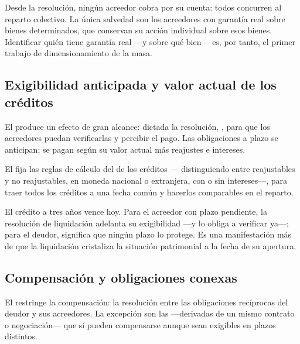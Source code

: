 \begin{foco}
Desde la resolución, ningún acreedor cobra por su cuenta: todos concurren al reparto colectivo.
La única salvedad son los acreedores con garantía real sobre bienes determinados, que conservan
su acción individual sobre esos bienes. Identificar quién tiene garantía real ---y sobre qué
bien--- es, por tanto, el primer trabajo de dimensionamiento de la masa.
\end{foco}

\subsection{Exigibilidad anticipada y valor actual de los créditos}

El  produce un efecto de gran alcance: dictada la resolución, , para que los
acreedores puedan verificarlas y percibir el pago. Las obligaciones a plazo se anticipan; se
pagan según su valor actual más reajustes e intereses.

El  fija las reglas de cálculo del  de los créditos ---
distinguiendo entre reajustables y no reajustables, en moneda nacional o extranjera, con o sin
intereses---, para traer todos los créditos a una fecha común y hacerlos comparables en el
reparto.

\begin{foco}
El crédito a tres años vence hoy. Para el acreedor con plazo pendiente, la resolución de
liquidación adelanta su exigibilidad ---y lo obliga a verificar ya---; para el deudor, significa
que ningún plazo lo protege. Es una manifestación más de que la liquidación cristaliza la
situación patrimonial a la fecha de su apertura.
\end{foco}

\subsection{Compensación y obligaciones conexas}

El  restringe la compensación: la resolución  entre las obligaciones recíprocas del
deudor y sus acreedores. La excepción son las  ---derivadas de un
mismo contrato o negociación--- que sí pueden compensarse aunque sean exigibles en plazos
distintos.

